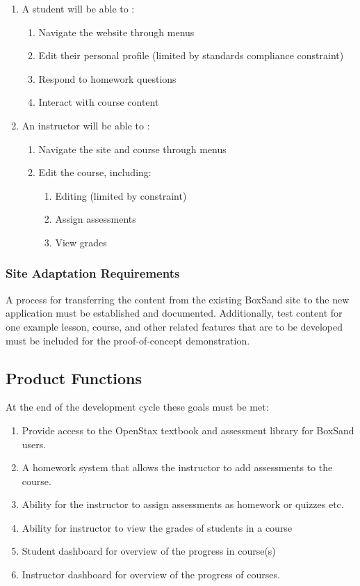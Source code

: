 \documentclass[onecolumn, draftclsnofoot,10pt, compsoc]{IEEEtran}
\begin{document}
\begin{enumerate}
\item A student will be able to :
\begin{enumerate}
\item Navigate the website through menus
\item Edit their personal profile (limited by standards compliance constraint)
\item Respond to homework questions
\item Interact with course content
\end{enumerate}
\item An instructor will be able to :
\begin{enumerate}
\item Navigate the site and course through menus
\item Edit the course, including:
\begin{enumerate}
    \item Editing (limited by constraint)
    \item Assign assessments
    \item View grades
\end{enumerate}
\end{enumerate}
\end{enumerate}

\subsubsection{Site Adaptation Requirements}
A process for transferring the content from the existing BoxSand site to the new application must be established and documented. Additionally, test content for one example lesson, course, and other related features that are to be developed must be included for the proof-of-concept demonstration. 

\subsection{Product Functions}
At the end of the development cycle these goals must be met:
\begin{enumerate}
\item Provide access to the OpenStax textbook and assessment library for BoxSand users.
\item A homework system that allows the instructor to add assessments to the course.
\item Ability for the instructor to assign assessments as homework or quizzes etc.
\item Ability for instructor to view the grades of students in a course 
\item Student dashboard for overview of the progress in course(s)
\item Instructor dashboard for overview of the progress of courses. 
\end{enumerate}
\end{document}
